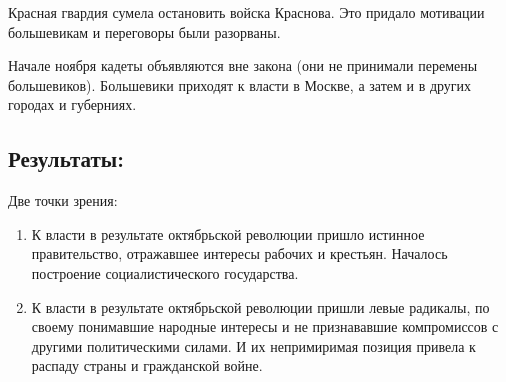 Красная гвардия сумела остановить войска Краснова. Это придало мотивации большевикам и переговоры были разорваны.

Начале ноября кадеты объявляются вне закона (они не принимали перемены большевиков). Большевики приходят к власти в Москве, а затем и в других городах и губерниях.

\subsection{Результаты:}

Две точки зрения:

\begin{enumerate}
    \item К власти в результате октябрьской революции пришло истинное правительство, отражавшее интересы рабочих и крестьян. Началось построение социалистического государства.
    \item К власти в результате октябрьской революции пришли левые радикалы, по своему понимавшие народные интересы и не признававшие компромиссов с другими политическими силами. И их непримиримая позиция привела к распаду страны и гражданской войне.
\end{enumerate}
